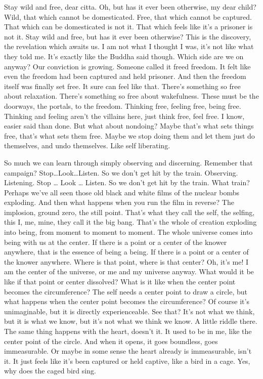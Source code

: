 \documentclass[12pt,openany]{book}
\begin{document}
Stay wild and free, dear citta. Oh, but has it ever been otherwise, my dear child? Wild, that which cannot be domesticated. Free, that which cannot be captured. That which can be domesticated is not it. That which feels like it's a prisoner is not it. Stay wild and free, but has it ever been otherwise? This is the discovery, the revelation which awaits us. I am not what I thought I was, it's not like what they told me. It's exactly like the Buddha said though. Which side are we on anyway? Our conviction is growing. Someone called it freed freedom. It felt like even the freedom had been captured and held prisoner. And then the freedom itself was finally set free. It sure can feel like that. There's something so free about relaxation. There’s something so free about wakefulness. These must be the doorways, the portals, to the freedom. Thinking free, feeling free, being free. Thinking and feeling aren't the villains here, just think free, feel free. I know, easier said than done. But what about nondoing? Maybe that's what sets things free, that’s what sets them free. Maybe we stop doing them and let them just do themselves, and undo themselves. Like self liberating.

So much we can learn through simply observing and discerning. Remember that campaign? Stop…Look…Listen. So we don't get hit by the train. Observing. Listening. Stop … Look … Listen. So we don't get hit by the train. What train? Perhaps we've all seen those old black and white films of the nuclear bombs exploding. And then what happens when you run the film in reverse? The implosion, ground zero, the still point. That's what they call the self, the selfing, this I, me, mine, they call it the big bang. That's the whole of creation exploding into being, from moment to moment to moment. The whole universe comes into being with us at the center. If there is a point or a center of the knower anywhere, that is the essence of being a being. If there is a point or a center of the knower anywhere. Where is that point, where is that center? Oh, it's me! I am the center of the universe, or me and my universe anyway. What would it be like if that point or center dissolved? What is it like when the center point becomes the circumference? The self needs a center point to draw a circle, but what happens when the center point becomes the circumference? Of course it's unimaginable, but it is directly experienceable. See that? It's not what we think, but it is what we know, but it’s not what we think we know. A little riddle there. The same thing happens with the heart, doesn't it. It used to be in me, like the center point of the circle. And when it opens, it goes boundless, goes immeasurable. Or maybe in some sense the heart already is immeasurable, isn't it. It just feels like it's been captured or held captive, like a bird in a cage. Yes, why does the caged bird sing.
\end{document}
